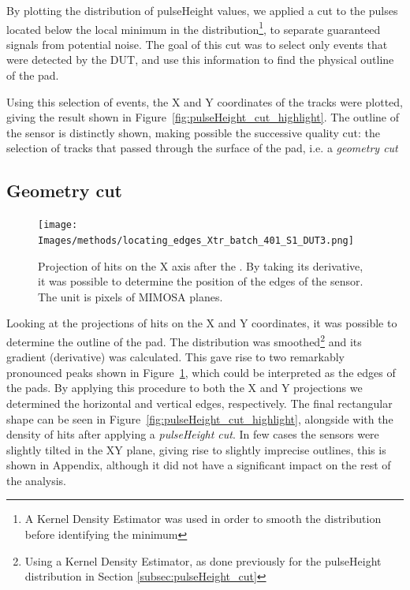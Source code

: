 By plotting the distribution of pulseHeight values, we applied a cut to the pulses located below the local minimum in the distribution\footnote{A Kernel Density Estimator was used in order to smooth the distribution before identifying the minimum}, to separate guaranteed signals from potential noise. The goal of this cut was to select only events that were detected by the DUT, and use this information to find the physical outline of the pad.

Using this selection of events, the X and Y coordinates of the tracks were plotted, giving the result shown in Figure~\ref{fig:pulseHeight_cut_highlight}. The outline of the sensor is distinctly shown, making possible the successive quality cut: the selection of tracks that passed through the surface of the pad, i.e. a \textit{geometry cut}

\subsection{Geometry cut}\label{sec:geometry_cut}

\begin{figure}[!ht]
    \centering
    \texttt{[image: Images/methods/locating\_edges\_Xtr\_batch\_401\_S1\_DUT3.png]}
    \captionsetup{width=\captionwidth}
    \caption{Projection of hits on the X axis after the . By taking its derivative, it was possible to determine the position of the edges of the sensor. The unit is pixels of MIMOSA planes.}
    \label{fig:edges_of_the_sensor}
\end{figure}

Looking at the projections of hits on the X and Y coordinates, it was possible to determine the outline of the pad. The distribution was smoothed\footnote{Using a Kernel Density Estimator, as done previously for the pulseHeight distribution in Section \ref{subsec:pulseHeight_cut}} and its gradient (derivative) was calculated. This gave rise to two remarkably pronounced peaks shown in Figure~\ref{fig:edges_of_the_sensor}, which could be interpreted as the edges of the pads. By applying this procedure to both the X and Y projections we determined the horizontal and vertical edges, respectively. The final rectangular shape can be seen in Figure~\ref{fig:pulseHeight_cut_highlight}, alongside with the density of hits after applying a \textit{pulseHeight cut}. In few cases the sensors were slightly tilted in the XY plane, giving rise to slightly imprecise outlines, this is  shown in Appendix, although it did not have a significant impact on the rest of the analysis.

